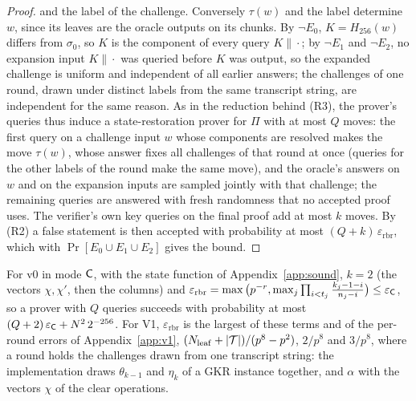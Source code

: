 \begin{proof}
and the label of the challenge. Conversely $\tau(w)$ and the label determine $w$, since its leaves
are the oracle outputs on its chunks. By $\neg E_0$, $K=H_{256}(w)$ differs from $\sigma_0$, so $K$
is the component of every query $K\|\cdot$; by $\neg E_1$ and $\neg E_2$, no expansion input
$K\|\cdot$ was queried before $K$ was output, so the expanded challenge is uniform and
independent of all earlier answers; the challenges of one round, drawn under distinct labels from
the same transcript string, are independent for the same reason.
As in the reduction behind (R3), the prover's queries thus induce a state-restoration prover for
$\Pi$ with at most $Q$ moves: the first query on a challenge input $w$ whose components are resolved
makes the move $\tau(w)$, whose answer fixes all challenges of that round at once (queries for the
other labels of the round make the same move), and the oracle's answers on $w$ and on the expansion
inputs are sampled jointly with that challenge; the remaining queries are answered with fresh
randomness that no accepted proof uses. The verifier's own key queries on the final proof add at
most $k$ moves. By (R2) a false statement is then accepted with probability at most
$(Q+k)\,\varepsilon_{\mathrm{rbr}}$, which with $\Pr[E_0\cup E_1\cup E_2]$ gives the bound.
\end{proof}

\begin{corollary}
\label{cor:fs-v0}
For v0 in mode $\mathsf{C}$, with the state function of Appendix~\ref{app:sound}, $k=2$ (the vectors
$\chi,\chi'$, then the columns) and
$\varepsilon_{\mathrm{rbr}}=\max\big(p^{-r},\max_j\prod_{i<t_j}\tfrac{k_j-1-i}{n_j-i}\big)\le
\varepsilon_{\mathsf{C}}$, so a prover with $Q$ queries succeeds with probability at most
$(Q+2)\,\varepsilon_{\mathsf{C}}+N^2\,2^{-256}$. For V1, $\varepsilon_{\mathrm{rbr}}$ is the largest of
these terms and of the per-round errors of Appendix~\ref{app:v1}, $(N_{\mathrm{leaf}}+|\mathcal{T}|)/(p^8-p^2)$,
$2/p^8$ and $3/p^8$, where a round holds the challenges drawn from one transcript string: the
implementation draws $\theta_{k-1}$ and $\eta_k$ of a GKR instance together, and $\alpha$ with the
vectors $\chi$ of the clear operations.
\end{corollary}

